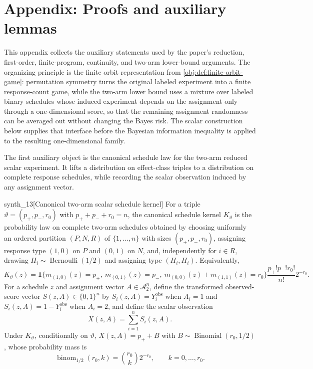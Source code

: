 \section{Appendix: Proofs and auxiliary lemmas}\label{sec:appendix-lemmas}

This appendix collects the auxiliary statements used by the paper's reduction, first-order, finite-program, continuity, and two-arm lower-bound arguments. The organizing principle is the finite orbit representation from \cref{obj:def:finite-orbit-game}: permutation symmetry turns the original labeled experiment into a finite response-count game, while the two-arm lower bound uses a mixture over labeled binary schedules whose induced experiment depends on the assignment only through a one-dimensional score, so that the remaining assignment randomness can be averaged out without changing the Bayes risk. The scalar construction below supplies that interface before the Bayesian information inequality is applied to the resulting one-dimensional family.

The first auxiliary object is the canonical schedule law for the two-arm reduced scalar experiment. It lifts a distribution on effect-class triples to a distribution on complete response schedules, while recording the scalar observation induced by any assignment vector.

\begin{definitionv}{synth_13}[Canonical two-arm scalar schedule kernel]
For a triple $\vartheta=(p_+,p_-,r_0)$ with $p_++p_-+r_0=n$, the canonical schedule kernel $K_\vartheta$ is the probability law on complete two-arm schedules obtained by choosing uniformly an ordered partition $(P,N,R)$ of $\{1,\ldots,n\}$ with sizes $(p_+,p_-,r_0)$, assigning response type $(1,0)$ on $P$ and $(0,1)$ on $N$, and, independently for $i\in R$, drawing $H_i\sim\operatorname{Bernoulli}(1/2)$ and assigning type $(H_i,H_i)$. Equivalently,
\[
K_\vartheta(z)=\mathbf 1\{m_{(1,0)}(z)=p_+,\ m_{(0,1)}(z)=p_-,\ m_{(0,0)}(z)+m_{(1,1)}(z)=r_0\}\frac{p_+!p_-!r_0!}{n!}2^{-r_0}.
\]
For a schedule $z$ and assignment vector $A\in\mathcal A_2^n$, define the transformed observed-score vector $S(z,A)\in\{0,1\}^n$ by $S_i(z,A)=Y_i^{\mathrm{obs}}$ when $A_i=1$ and $S_i(z,A)=1-Y_i^{\mathrm{obs}}$ when $A_i=2$, and define the scalar observation
\[
X(z,A)=\sum_{i=1}^n S_i(z,A).
\]
Under $K_\vartheta$, conditionally on $\vartheta$, $X(z,A)=p_++B$ with $B\sim\operatorname{Binomial}(r_0,1/2)$, whose probability mass is
\[
\operatorname{binom}_{1/2}(r_0,k)=\binom{r_0}{k}2^{-r_0},\qquad k=0,\ldots,r_0.
\]
\end{definitionv}

